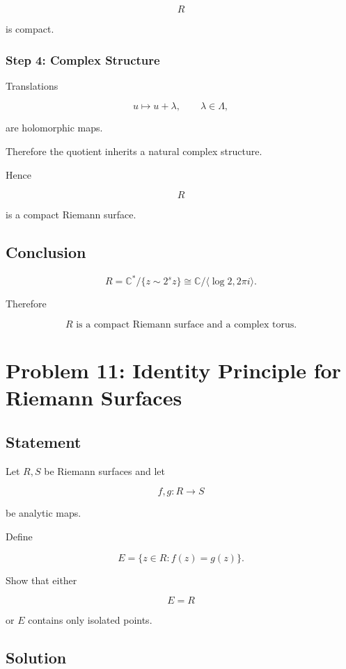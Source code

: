 \documentclass[12pt,a4paper]{article}
\theoremstyle{notespace}
\begin{document}
\[
R
\]

is compact.

\subsubsection*{Step 4: Complex Structure}

Translations

\[
u\mapsto u+\lambda,
\qquad
\lambda\in\Lambda,
\]

are holomorphic maps.

Therefore the quotient inherits a natural complex structure.

Hence

\[
R
\]

is a compact Riemann surface.

\subsection*{Conclusion}

\[
\boxed{
	R
	=
	\mathbb C^\ast/\{z\sim2^s z\}
	\cong
	\mathbb C/
	\langle\log2,2\pi i\rangle.
}
\]

Therefore

\[
\boxed{
	R
	\text{ is a compact Riemann surface and a complex torus.}
}
\]

\bigskip

\section{Problem 11: Identity Principle for Riemann Surfaces}

\subsection*{Statement}

Let \(R,S\) be Riemann surfaces and let

\[
f,g:R\to S
\]

be analytic maps.

Define

\[
E
=
\{z\in R:f(z)=g(z)\}.
\]

Show that either

\[
E=R
\]

or \(E\) contains only isolated points.

\subsection*{Solution}
\end{document}
